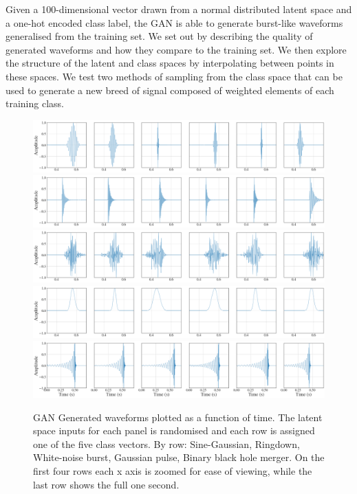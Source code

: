 \documentclass[12pt]{iopart}
\begin{document}
%
Given a 100-dimensional vector drawn from a normal distributed latent space and a one-hot encoded class
label, the GAN is able to generate burst-like waveforms generalised from the
training set. We set out by describing the quality of generated waveforms and
how they compare to the training set. We then explore the structure of the
latent and class spaces by interpolating between points in these spaces. We
test two methods of sampling from the class space that can be used to generate
a new breed of signal composed of weighted elements of each training class.


\begin{figure}
    \centering
    \includegraphics[width=\textwidth]{figures/generations/sg.png}
    \includegraphics[width=\textwidth]{figures/generations/rd.png}
    \includegraphics[width=\textwidth]{figures/generations/wnb.png}
    \includegraphics[width=\textwidth]{figures/generations/blip.png}
    \includegraphics[width=\textwidth]{figures/generations/bbh.png}
    \caption{\ac{GAN} Generated waveforms plotted as a function of time. The latent space inputs for each panel is randomised and each row is assigned one of the five class vectors. By row: Sine-Gaussian, Ringdown,
White-noise burst, Gaussian pulse, Binary black hole merger. On the first four rows each x axis is zoomed for ease of viewing, while the last row shows the full one second.}
\label{fig:gen_signals} 
\end{figure}
\end{document}
